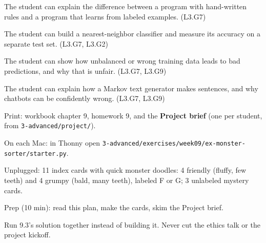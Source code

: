 
\begin{objectives}
  \item The student can explain the difference between a program with hand-written rules and a program that learns from labeled examples. (L3.G7)
  \item The student can build a nearest-neighbor classifier and measure its accuracy on a separate test set. (L3.G7, L3.G2)
  \item The student can show how unbalanced or wrong training data leads to bad predictions, and why that is unfair. (L3.G7, L3.G9)
  \item The student can explain how a Markov text generator makes sentences, and why chatbots can be confidently wrong. (L3.G7, L3.G9)
\end{objectives}

\begin{materials}
  \item Print: workbook chapter 9, homework 9, and the \textbf{Project brief} (one per student, from \texttt{3-advanced/project/}).
  \item On each Mac: in Thonny open \texttt{3-advanced/exercises/week09/ex-monster-sorter/starter.py}.
  \item Unplugged: 11 index cards with quick monster doodles: 4 friendly (fluffy, few teeth) and 4 grumpy (bald, many teeth), labeled F or G; 3 unlabeled mystery cards.
  \item Prep (10 min): read this plan, make the cards, skim the Project brief.
\end{materials}

\begin{timeplan}
\end{timeplan}
\begin{teachernote}
Run 9.3's solution together instead of building it. Never cut the ethics talk or the project kickoff.
\end{teachernote}

